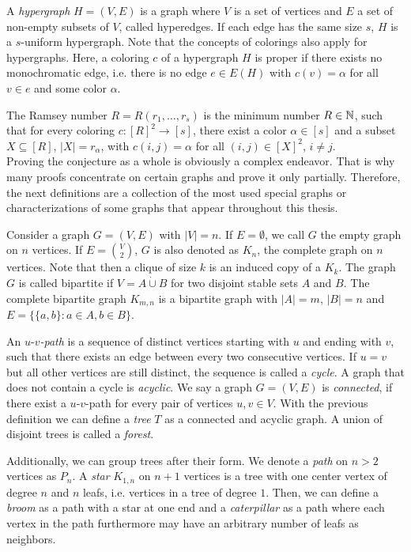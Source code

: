 A \textit{hypergraph} $H=(V,E)$ is a graph where $V$ is a set of vertices and $E$ a set of non-empty subsets of $V$, called hyperedges. If each edge has the same size $s$, $H$ is a $s$-uniform hypergraph. Note that the concepts of colorings also apply for hypergraphs. Here, a coloring $c$ of a hypergraph $H$ is proper if there exists no monochromatic edge, i.e. there is no edge $e\in E(H)$ with $c(v)=\alpha$ for all $v\in e$ and some color $\alpha$.

The Ramsey number $R=R(r_1,\dots ,r_s)$ is the minimum number $R\in\mathbb{N}$, such that for every coloring $c:[R]^2\to [s]$, there exist a color $\alpha\in [s]$ and a subset $X\subseteq [R]$, $\vert X\vert =r_{\alpha}$, with $c(i,j)=\alpha$ for all $(i,j)\in [X]^2$, $i\neq j$.
\\[2ex]
Proving the conjecture as a whole is obviously a complex endeavor. That is why many proofs concentrate on certain graphs and prove it only partially. Therefore, the next definitions are a collection of the most used special graphs or characterizations of some graphs that appear throughout this thesis.


Consider a graph $G=(V,E)$ with $\vert V\vert = n$. If $E=\emptyset$, we call $G$ the empty graph on $n$ vertices. If $E= {V\choose{2}}$, $G$ is also denoted as $K_n$, the complete graph on $n$ vertices. Note that then a clique of size $k$ is an induced copy of a $K_k$. The graph $G$ is called bipartite if $V=A\dot{\cup} B$ for two disjoint stable sets $A$ and $B$. The complete bipartite graph $K_{m,n}$ is a bipartite graph with $\vert A\vert =m$, $\vert B\vert =n$ and $E=\lbrace \lbrace a,b\rbrace :a\in A,b\in B\rbrace$.

An $u$-$v$\textit{-path} is a sequence of distinct vertices starting with $u$ and ending with $v$, such that there exists an edge between every two consecutive vertices. If $u=v$ but all other vertices are still distinct, the sequence is called a \textit{cycle}. A graph that does not contain a cycle is \textit{acyclic}. We say a graph $G=(V,E)$ is \textit{connected}, if there exist a $u$-$v$-path for every pair of vertices $u,v\in V$.
With the previous definition we can define a \textit{tree} $T$ as a connected and acyclic graph. A union of disjoint trees is called a \textit{forest}.

Additionally, we can group trees after their form. We denote a \textit{path} on $n>2$ vertices as $P_n$. A \textit{star} $K_{1,n}$ on $n+1$ vertices is a tree with one center vertex of degree $n$ and $n$ leafs, i.e. vertices in a tree of degree $1$. Then, we can define a \textit{broom} as a path with a star at one end and a \textit{caterpillar} as a path where each vertex in the path furthermore may have an arbitrary number of leafs as neighbors.

